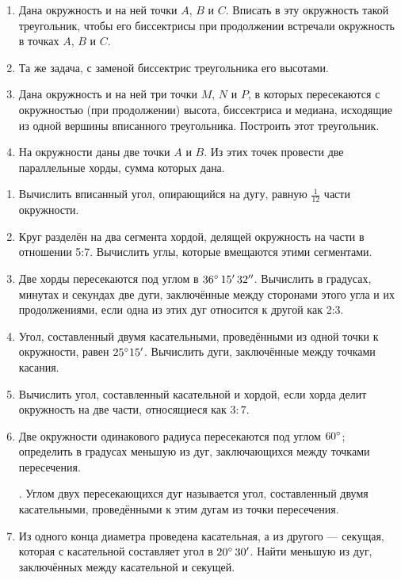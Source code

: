 \documentclass[oneside]{book}
\begin{document}
\begin{enumerate}[resume]
 \item
Дана окружность и на ней точки $A$, $B$ и $C$.
Вписать в эту окружность такой треугольник, чтобы его биссектрисы при продолжении встречали окружность в точках $A$, $B$ и $C$.

 \item
Та же задача, с заменой биссектрис треугольника его высотами.

 \item
Дана окружность и на ней три точки $M$, $N$ и $P$, в которых пересекаются с окружностью (при продолжении) высота, биссектриса и медиана, исходящие из одной вершины вписанного треугольника.
Построить этот треугольник.

 \item
На окружности даны две точки $A$ и $B$.
Из этих точек провести две параллельные хорды, сумма которых дана.

\end{enumerate}

\begin{center}
\end{center}

\begin{enumerate}[resume]

 \item
Вычислить вписанный угол, опирающийся на дугу, равную $\tfrac1{12}$ части окружности.

 \item
Круг разделён на два сегмента хордой, делящей окружность на части в отношении 5:7.
Вычислить углы, которые вмещаются этими сегментами.

 \item
Две хорды пересекаются под углом в $36\degree\, 15'\, 32''$.
Вычислить в градусах, минутах и секундах две дуги, заключённые между сторонами этого угла и их продолжениями, если одна из этих дуг относится к другой как 2:3.

 \item
Угол, составленный двумя касательными, проведёнными из одной точки к окружности, равен $25\degree15'$.
Вычислить дуги, заключённые между точками касания.

 \item
Вычислить угол, составленный касательной и хордой, если хорда делит окружность на две части, относящиеся как $3:7$.

 \item
Две окружности одинакового радиуса пересекаются под углом $60\degree$;
определить в градусах меньшую из дуг, заключающихся между точками пересечения. %

.
Углом двух пересекающихся дуг называется угол, составленный двумя касательными, проведёнными к этим дугам из точки пересечения.

 \item
Из одного конца диаметра проведена касательная, а из другого — секущая, которая с касательной составляет угол в $20\degree\,30'$.
Найти меньшую из дуг, заключённых между касательной и секущей.

\end{enumerate}
\end{document}
